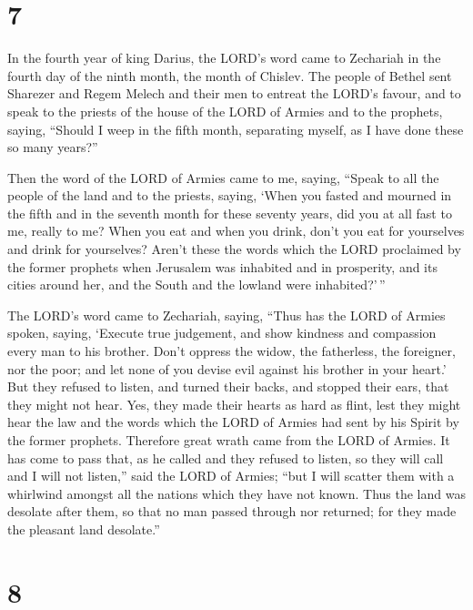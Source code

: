 \hypertarget{section-6}{%
\section{7}\label{section-6}}

 In the fourth year of king Darius, the LORD's word came to
Zechariah in the fourth day of the ninth month, the month of Chislev.
 The people of Bethel sent Sharezer and Regem Melech and
their men to entreat the LORD's favour,  and to speak to the
priests of the house of the LORD of Armies and to the prophets, saying,
``Should I weep in the fifth month, separating myself, as I have done
these so many years?''

 Then the word of the LORD of Armies came to me, saying,
 ``Speak to all the people of the land and to the priests,
saying, `When you fasted and mourned in the fifth and in the seventh
month for these seventy years, did you at all fast to me, really to me?
 When you eat and when you drink, don't you eat for
yourselves and drink for yourselves?  Aren't these the words
which the LORD proclaimed by the former prophets when Jerusalem was
inhabited and in prosperity, and its cities around her, and the South
and the lowland were inhabited?'\,''

 The LORD's word came to Zechariah, saying, 
``Thus has the LORD of Armies spoken, saying, `Execute true judgement,
and show kindness and compassion every man to his brother. 
Don't oppress the widow, the fatherless, the foreigner, nor the poor;
and let none of you devise evil against his brother in your heart.'
 But they refused to listen, and turned their backs, and
stopped their ears, that they might not hear.  Yes, they
made their hearts as hard as flint, lest they might hear the law and the
words which the LORD of Armies had sent by his Spirit by the former
prophets. Therefore great wrath came from the LORD of Armies.
 It has come to pass that, as he called and they refused to
listen, so they will call and I will not listen,'' said the LORD of
Armies;  ``but I will scatter them with a whirlwind amongst
all the nations which they have not known. Thus the land was desolate
after them, so that no man passed through nor returned; for they made
the pleasant land desolate.''

\hypertarget{section-7}{%
\section{8}\label{section-7}}

